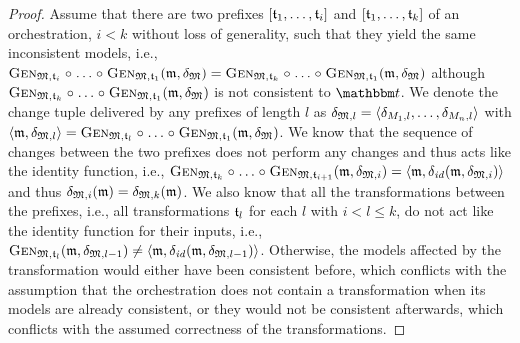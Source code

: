 \begin{proof}
    Assume that there are two prefixes $\sequenced{\transformation{t}_{1}, \dots, \transformation{t}_{i}}$ and $\sequenced{\transformation{t}_{1}, \dots, \transformation{t}_{k}}$ of an orchestration, $i < k$ without loss of generality, such that they yield the same inconsistent models, i.e., $\generalizationfunction{\metamodeltuple{M}, \transformation{t}_{i}} \concatfunction \dots \concatfunction \generalizationfunction{\metamodeltuple{M}, \transformation{t}_{1}}(\modeltuple{m}, \changetuple{\metamodeltuple{M}}) = \generalizationfunction{\metamodeltuple{M}, \transformation{t}_{k}} \concatfunction \dots \concatfunction \generalizationfunction{\metamodeltuple{M}, \transformation{t}_{1}}(\modeltuple{m}, \changetuple{\metamodeltuple{M}})$ although $\generalizationfunction{\metamodeltuple{M}, \transformation{t}_{k}} \concatfunction \dots \concatfunction \generalizationfunction{\metamodeltuple{M}, \transformation{t}_{1}}(\modeltuple{m}, \changetuple{\metamodeltuple{M}})$ is not consistent to $\transformationset{T}$.
    We denote the change tuple delivered by any prefixes of length $l$ as $\changetuple{\metamodeltuple{M},l} = \tupled{\change{\metamodel{M}{1},l}, \dots, \change{\metamodel{M}{n}, l}}$ with $\tupled{\modeltuple{m}, \changetuple{\metamodeltuple{M},l}} = \generalizationfunction{\metamodeltuple{M}, \transformation{t}_{l}} \concatfunction \dots \concatfunction \generalizationfunction{\metamodeltuple{M}, \transformation{t}_{1}}(\modeltuple{m}, \changetuple{\metamodeltuple{M}})$.
    We know that the sequence of changes between the two prefixes does not perform any changes and thus acts like the identity function, i.e., $\generalizationfunction{\metamodeltuple{M}, \transformation{t}_{k}} \concatfunction \dots \concatfunction \generalizationfunction{\metamodeltuple{M}, \transformation{t}_{i+1}}(\modeltuple{m}, \changetuple{\metamodeltuple{M},i}) = \tupled{\modeltuple{m},\identitychange(\modeltuple{m}, \changetuple{\metamodeltuple{M},i})}$
    and thus $\changetuple{\metamodeltuple{M},i}(\modeltuple{m}) = \changetuple{\metamodeltuple{M},k}(\modeltuple{m})$.
    We also know that all the transformations between the prefixes, i.e., all transformations $\transformation{t}_{l}$ for each $l$ with $i < l \leq k$, do not act like the identity function for their inputs, i.e., $\generalizationfunction{\metamodeltuple{M}, \transformation{t}_{l}}(\modeltuple{m}, \changetuple{\metamodeltuple{M},l-1}) \neq \tupled{\modeltuple{m}, \identitychange(\modeltuple{m}, \changetuple{\metamodeltuple{M},l-1})}$.
    Otherwise, the models affected by the transformation would either have been consistent before, which conflicts with the assumption that the orchestration does not contain a transformation when its models are already consistent, or they would not be consistent afterwards, which conflicts with the assumed correctness of the transformations.


\end{proof}
